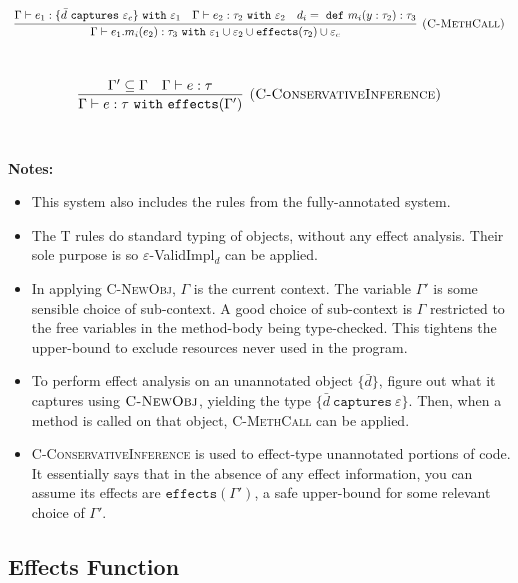 \documentclass{llncs}
\newcommand{\keywadj}[1]{\mathtt{#1}}
\newcommand{\keyw}[1]{\keywadj{#1}~}
\begin{document}
\[
\begin{array}{c}
\infer[\textsc{(C-MethCall)}]
	{\Gamma \vdash e_1.m_i(e_2) : \tau_3~ \keyw{with} \varepsilon_1 \cup \varepsilon_2 \cup \keywadj{effects}(\tau_2) \cup \varepsilon_c}
	{\Gamma \vdash e_1 : \{ \bar d~\keyw{captures} \varepsilon_c \}~\keyw{with} \varepsilon_1 & \Gamma \vdash e_2:\tau_2~\keyw{with} \varepsilon_2&d_i =~\keyw{def} m_i(y:\tau_2):\tau_3 } \\[5ex]
\end{array}
\]

\[
\begin{array}{c}
\infer[\textsc{(C-ConservativeInference)}]
	{\Gamma \vdash e : \tau ~\keyw{with} \keywadj{effects}(\Gamma') }
	{\Gamma' \subseteq \Gamma & \Gamma \vdash e : \tau } \\[5ex]
\end{array}
\]

\noindent \textbf{Notes:}

\begin{itemize}
	\item This system also includes the rules from the fully-annotated system.
	\item The \textsc{T} rules do standard typing of objects, without any effect analysis. Their sole purpose is so $\varepsilon$-ValidImpl$_d$ can be applied.
	\item In applying \textsc{C-NewObj}, $\Gamma$ is the current context. The variable $\Gamma'$ is some sensible choice of sub-context. A good choice of sub-context is $\Gamma$ restricted to the free variables in the method-body being type-checked. This tightens the upper-bound to exclude resources never used in the program.
	\item To perform effect analysis on an unannotated object $\{ \bar d \}$, figure out what it captures using $\textsc{C-NewObj}$, yielding the type $\{ \bar d~\keyw{captures} \varepsilon \}$. Then, when a method is called on that object, \textsc{C-MethCall} can be applied.
	\item \textsc{C-ConservativeInference} is used to effect-type unannotated portions of code. It essentially says that in the absence of any effect information, you can assume its effects are $\keywadj{effects(\Gamma')}$, a safe upper-bound for some relevant choice of $\Gamma'$.
\end{itemize}

\subsection{Effects Function}
\end{document}
